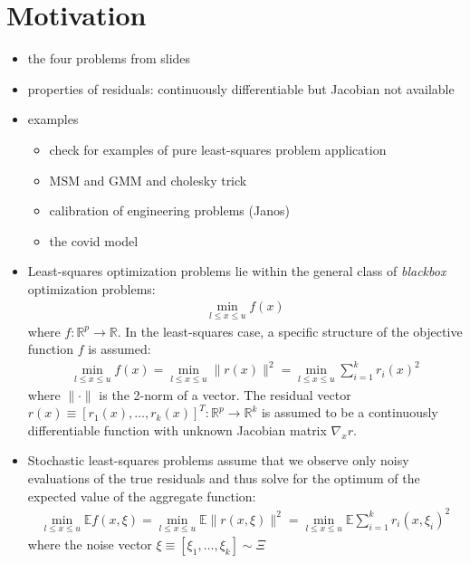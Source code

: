 
\section{Motivation}
\label{sec:motivationcd}

\begin{itemize}
    \item the four problems from slides
    \item properties of residuals: continuously differentiable but Jacobian not available
    \item examples
        \begin{itemize}
            \item check for examples of pure least-squares problem application
            \item MSM and GMM and cholesky trick
            \item calibration of engineering problems (Janos)
            \item the covid model
        \end{itemize}
\end{itemize}


\begin{itemize}
    \item Least-squares optimization problems lie within the general class of \textit{blackbox} optimization problems:
        \begin{align}
            \min\limits_{l\leq x\leq u}f(x)
            \label{eq:problem-scalar-det}
        \end{align}
    where $f:\mathbb{R}^p\rightarrow\mathbb{R}$. In the least-squares case, a specific structure of the objective function $f$ is assumed:
        \begin{align}
            \min\limits_{l\leq x\leq u}f(x)=\min\limits_{l\leq x\leq u}\lVert r(x)\rVert^2=\min\limits_{l\leq x\leq u}\sum\limits_{i=1}^kr_i(x)^2
            \label{eq:problem-ls-det}
        \end{align}
    where $\lVert\cdot\rVert$ is the 2-norm of a vector. The residual vector $r(x)\equiv[r_1(x),\dots,r_k(x)]^T:\mathbb{R}^p\rightarrow\mathbb{R}^k$ is assumed to be a continuously differentiable function with unknown Jacobian matrix $\nabla_xr$.
    \item Stochastic least-squares problems assume that we observe only noisy evaluations of the true residuals and thus solve for the optimum of the expected value of the aggregate function:
        \begin{align}
            \min\limits_{l\leq x\leq u}\mathbb{E}f(x,\xi)=\min\limits_{l\leq x\leq u}\mathbb{E}\lVert r(x,\xi)\rVert^2=\min\limits_{l\leq x\leq u}\mathbb{E}\sum\limits_{i=1}^kr_i(x, \xi_i)^2
            \label{eq:problem-ls-noise}
        \end{align}
    where the noise vector $\xi\equiv[\xi_1,\dots,\xi_k]\sim\Xi$
\end{itemize}
